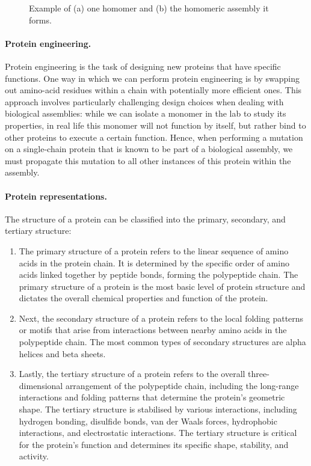 \begin{figure}
{    }
    \caption{Example of (a) one homomer and  (b) the homomeric assembly it forms.}
    \label{assembly}
\end{figure}

\paragraph{Protein engineering.}
Protein engineering is the task of designing new proteins that have specific functions.
One way in which we can perform protein engineering is by swapping out amino-acid residues within a chain with potentially more efficient ones.
This approach involves particularly challenging design choices when dealing with biological assemblies: while we can isolate a monomer in the lab to study its properties, in real life this monomer will not function by itself, but rather bind to other proteins to execute a certain function.
Hence, when performing a mutation on a single-chain protein that is known to be part of a biological assembly, we must propagate this mutation to all other instances of this protein within the assembly.

\paragraph{Protein representations.}
The structure of a protein can be classified into the primary, secondary, and tertiary structure:
\begin{enumerate}
\item The primary structure of a protein refers to the linear sequence of amino acids in the protein chain. 
It is determined by the specific order of amino acids linked together by peptide bonds, forming the polypeptide chain. The primary structure of a protein is the most basic level of protein structure and dictates the overall chemical properties and function of the protein.
\item Next, the secondary structure of a protein refers to the local folding patterns or motifs that arise from interactions between nearby amino acids in the polypeptide chain. 
The most common types of secondary structures are alpha helices and beta sheets.
\item Lastly, the tertiary structure of a protein refers to the overall three-dimensional arrangement of the polypeptide chain, including the long-range interactions and folding patterns that determine the protein's geometric shape. 
The tertiary structure is stabilised by various interactions, including hydrogen bonding, disulfide bonds, van der Waals forces, hydrophobic interactions, and electrostatic interactions. The tertiary structure is critical for the protein's function and determines its specific shape, stability, and activity.
\end{enumerate}

